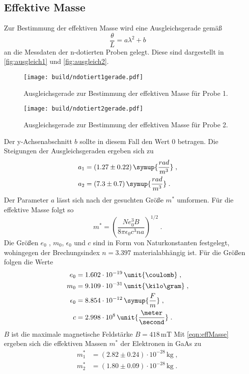 \subsection{Effektive Masse}
Zur Bestimmung der effektiven Masse wird eine Ausgleichsgerade gemäß
\begin{equation*}
    \frac{\theta}{L}=a\lambda ^2 +b
\end{equation*} 
an die Messdaten der n-dotierten Proben gelegt. Diese sind dargestellt in \autoref{fig:ausgleich1} und \autoref{fig:ausgleich2}.
\begin{figure}[H]
    \centering
    \texttt{[image: build/ndotiert1gerade.pdf]}
    \caption{Ausgleichsgerade zur Bestimmung der effektiven Masse für Probe 1.}
    \label{fig:ausgleich1}
\end{figure}
\begin{figure}[H]
    \centering
    \texttt{[image: build/ndotiert2gerade.pdf]}
    \caption{Ausgleichsgerade zur Bestimmung der effektiven Masse für Probe 2.}
    \label{fig:ausgleich2}
\end{figure}
Der y-Achsenabschnitt $b$ sollte in diesem Fall den Wert 0 betragen. Die Steigungen der Ausgleichsgeraden ergeben sich zu 
\begin{align*}
    a_1 &= (1.27 \pm 0.22) \,\symup{\frac{rad}{m^3}} \; ,\\
    a_2 &= (7.3 \pm 0.7) \,\symup{\frac{rad}{m^3}}\; .
\end{align*}
Der Parameter $a$ lässt sich nach der gesuchten Größe $m^*$ umformen. Für die effektive Masse folgt so
\begin{equation}
    m^*=\left(\frac{Ne_0^3 B}{8\pi \epsilon_0 c^3 na}\right)^{1/2}\; .
    \label{eqn:effMasse}
\end{equation}
Die Größen $e_0$ , $m_0$, $\epsilon_0$ und $c$ sind in Form von Naturkonstanten festgelegt, wohingegen der Brechungsindex $n=3.397$\cite{GaAs} materialabhängig ist.
Für die Größen folgen die Werte 
\begin{align*}
    e_0&= 1.602 \cdot 10^{-19} \, \unit{\coulomb}\; ,\\
    m_0&= 9.109 \cdot 10^{-31}\, \unit{\kilo \gram}\; ,\\
    \epsilon_0 &= 8.854 \cdot 10^{-12}\,\symup{\frac{F}{m}} \;,\\
    c&= 2.998 \cdot 10^8\, \unit{\frac{\meter}{\second}}\; .
\end{align*}
$B$ ist die maximale magnetische Feldstärke $B=418\, \unit{\milli \tesla}$
Mit \autoref{eqn:effMasse} ergeben sich die effektiven Massen $m^*$ der Elektronen in GaAs zu 
\begin{align*}
    m^*_1 &= (2.82 \pm 0.24)\cdot 10^{-28}\,\unit{\kilogram}\; ,\\
    m^*_2&= (1.80 \pm 0.09)\cdot 10^{-28}\,\unit{\kilogram} \; .
\end{align*}